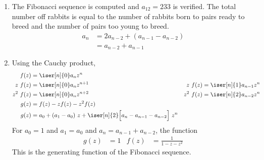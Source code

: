\begin{enumerate}
\begin{enumerate}
              \item The Fibonacci sequence is computed and $ a_{12} = 233 $ is verified.
                    The total number off rabbits is equal to the number of rabbits born to
                    pairs ready to breed and the number of pairs too young to breed.
                    \begin{align}
                        a_{n} & = 2a_{n-2} + (a_{n-1} - a_{n-2}) \\
                              & = a_{n-2} + a_{n-1}
                    \end{align}

              \item Using the Cauchy product,
                    \begin{align}
                        f(z)      & = \iser[n]{0} a_n z^n                  \\
                        z\ f(z)   & = \iser[n]{0} a_n z^{n+1}            &
                        z\ f(z)   & = \iser[n]{1} a_{n-1} z^n              \\
                        z^2\ f(z) & = \iser[n]{0} a_n z^{n+2}            &
                        z^2\ f(z) & = \iser[n]{2} a_{n-2} z^n              \\
                        g(z)      & = f(z) - zf(z) - z^2f(z)               \\
                        g(z)      & = a_0 + (a_1 - a_0)\ z + \iser[n]{2}
                        \Big[ a_n - a_{n-1} - a_{n-2} \Big]\ z^n
                    \end{align}
                    For $ a_0 = 1 $ and $ a_1 = a_0 $ and
                    $ a_n = a_{n-1} + a_{n-2} $, the function
                    \begin{align}
                        g(z) & = 1 & f(z) & = \frac{1}{1 - z - z^2}
                    \end{align}
                    This is the generating function of the Fibonacci sequence.
          \end{enumerate}

\end{enumerate}